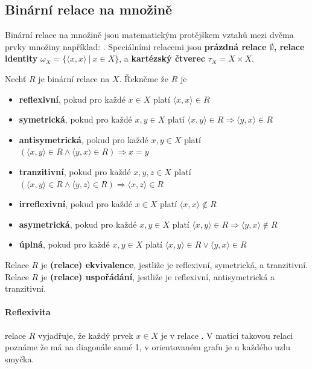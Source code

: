 \subsection{Binární relace na množině}
Binární relace na množině jsou matematickým protějškem vztahů mezi dvěma prvky množiny například: . Speciálními relacemi jsou \textbf{prázdná relace $\emptyset$, relace identity} $\omega_X = \{ \langle x, x \rangle \ | \ x \in X \}$, a \textbf{kartézský čtverec} $\tau_X = X \times X$.

\begin{definition}
Nechť $R$ je binární relace na $X$. Řekněme že $R$ je
\begin{itemize}
	\item \textbf{reflexivní}, pokud pro každé $x \in X$ platí $\langle x, x \rangle \in R$
	\item \textbf{symetrická}, pokud pro každé $x,y \in X$ platí $\langle x, y \rangle \in R \Rightarrow \langle y, x \rangle \in R$
	\item \textbf{antisymetrická}, pokud pro každé $x,y \in X$ platí \\$(\langle x, y \rangle \in R \wedge \langle y, x \rangle \in R) \Rightarrow x = y$
	\item \textbf{tranzitivní}, pokud pro každé $x,y,z \in X$ platí \\$(\langle x, y \rangle \in R \wedge \langle y, z \rangle \in R) \Rightarrow \langle x, z \rangle \in R$
	\item \textbf{irreflexivní}, pokud pro každé $x \in X$ platí $\langle x,x \rangle \not\in R$
	\item \textbf{asymetrická}, pokud pro každé $x,y \in X$ platí $\langle x, y \rangle \in R \Rightarrow \langle y, x \rangle \not\in R$
	\item \textbf{úplná}, pokud pro každé $x,y \in X$ platí $\langle x, y \rangle \in R \vee \langle y, x \rangle \in R$
\end{itemize}
\end{definition}

Relace $R$ je \textbf{(relace) ekvivalence}, jestliže je reflexivní, symetrická, a tranzitivní. Relace $R$ je \textbf{(relace) uspořádání}, jestliže je reflexivní, anti\-symetrická a tranzitivní.

\paragraph{Reflexivita} relace $R$ vyjadřuje, že každý prvek $x \in X$ je v relace . V matici takovou relaci poznáme že má na diagonále samé 1, v orientovaném grafu je u každého uzlu smyčka.

